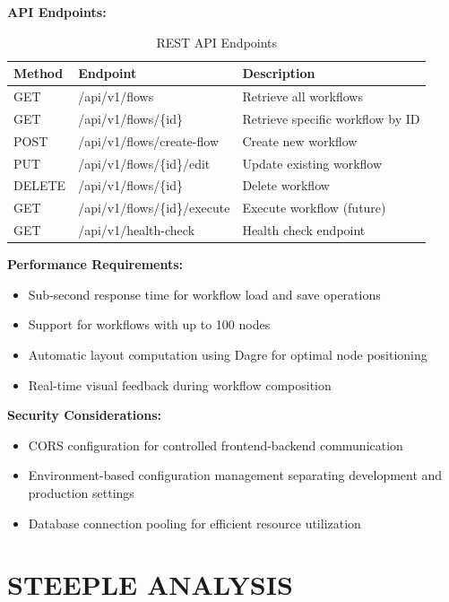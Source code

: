 \documentclass[12pt]{article}
\begin{document}
\textbf{API Endpoints:}

\begin{table}[h]
\centering
\caption{REST API Endpoints}
\label{tab:api_endpoints}
\begin{tabular}{|l|l|p{6cm}|}
\hline
\textbf{Method} & \textbf{Endpoint} & \textbf{Description} \\
\hline
GET & /api/v1/flows & Retrieve all workflows \\
GET & /api/v1/flows/\{id\} & Retrieve specific workflow by ID \\
POST & /api/v1/flows/create-flow & Create new workflow \\
PUT & /api/v1/flows/\{id\}/edit & Update existing workflow \\
DELETE & /api/v1/flows/\{id\} & Delete workflow \\
GET & /api/v1/flows/\{id\}/execute & Execute workflow (future) \\
GET & /api/v1/health-check & Health check endpoint \\
\hline
\end{tabular}
\end{table}

\textbf{Performance Requirements:}
\begin{itemize}
    \item Sub-second response time for workflow load and save operations
    \item Support for workflows with up to 100 nodes
    \item Automatic layout computation using Dagre for optimal node positioning
    \item Real-time visual feedback during workflow composition
\end{itemize}

\textbf{Security Considerations:}
\begin{itemize}
\item CORS configuration for controlled frontend-backend communication
\item Environment-based configuration management separating development and production settings
\item Database connection pooling for efficient resource utilization
\end{itemize}

\newpage
\section{STEEPLE ANALYSIS}
\end{document}
